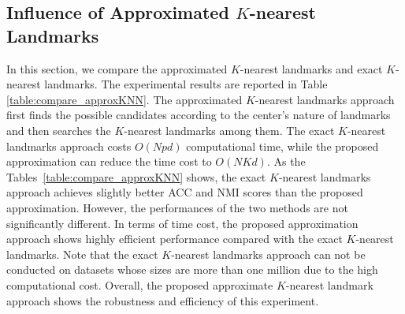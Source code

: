 \subsection{Influence of Approximated $K$-nearest Landmarks}
\label{sec:cmpApproxKNN}

In this section, we compare the approximated $K$-nearest landmarks and exact $K$-nearest landmarks.
The experimental results are reported in Table \ref{table:compare_approxKNN}.
The approximated $K$-nearest landmarks approach first finds the possible candidates according to the center's nature of landmarks and then searches the $K$-nearest landmarks among them.
The exact $K$-nearest landmarks approach costs $O(Npd)$ computational time, while the proposed approximation can reduce the time cost to $O(NKd)$.
As the Tables~\ref{table:compare_approxKNN} shows, the exact $K$-nearest landmarks approach achieves slightly better ACC and NMI scores than the proposed approximation.
However, the performances of the two methods are not significantly different.
In terms of time cost, the proposed approximation approach shows highly efficient performance compared with the exact $K$-nearest landmarks.
Note that the exact $K$-nearest landmarks approach can not be conducted on datasets whose sizes are more than one million due to the high computational cost.
Overall, the proposed approximate $K$-nearest landmark approach shows the robustness and efficiency of this experiment.

